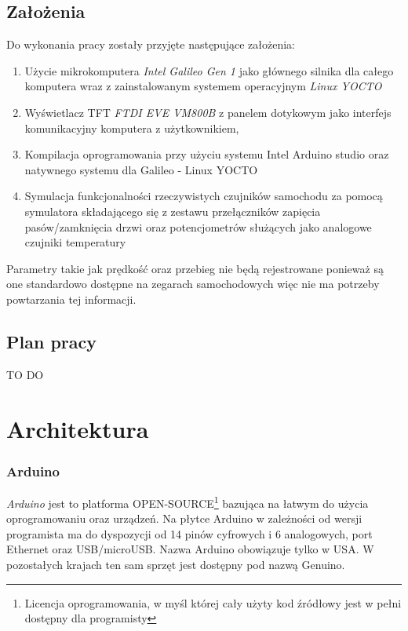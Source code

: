 \documentclass{xmgr}
\begin{document}
\section{Założenia}
Do wykonania pracy zostały przyjęte następujące założenia:
\begin{enumerate}
	\item Użycie mikrokomputera \emph{Intel Galileo Gen 1} jako głównego silnika dla całego komputera wraz z zainstalowanym systemem operacyjnym \emph{Linux YOCTO}
	\item Wyświetlacz TFT \emph{FTDI EVE VM800B} z panelem dotykowym jako interfejs komunikacyjny komputera z użytkownikiem, 
	\item Kompilacja oprogramowania przy użyciu systemu Intel Arduino studio oraz natywnego systemu dla Galileo - Linux YOCTO
	\item Symulacja funkcjonalności rzeczywistych czujników samochodu za pomocą symulatora składającego się z zestawu przełączników zapięcia pasów/zamknięcia drzwi oraz potencjometrów służących jako analogowe czujniki temperatury
\end{enumerate}

Parametry takie jak prędkość oraz przebieg nie będą rejestrowane ponieważ są one standardowo dostępne na zegarach samochodowych więc nie ma potrzeby powtarzania tej informacji.

\section{Plan pracy}
TO DO

\chapter{Architektura}
\subsection{Arduino}
\emph{Arduino} jest to platforma OPEN-SOURCE\footnote{Licencja oprogramowania, w myśl której cały użyty kod źródłowy jest w pełni dostępny dla programisty} bazująca na łatwym do użycia oprogramowaniu oraz urządzeń. Na płytce Arduino w zależności od wersji programista ma do dyspozycji od 14 pinów cyfrowych i 6 analogowych, port Ethernet oraz USB/microUSB. Nazwa Arduino obowiązuje tylko w USA. W pozostałych krajach ten sam sprzęt jest dostępny pod nazwą Genuino.
\end{document}
